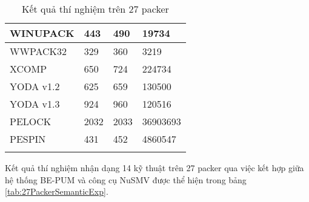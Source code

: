 \begin{small}
\begin{longtable}{|l|l|l|l|}
\hline 
WINUPACK							& 443				& 490				& 19734			\\
\hline 
WWPACK32							& 329				& 360				& 3219			\\
\hline 
XCOMP								& 650				& 724				& 224734		\\
\hline 
YODA v1.2							& 625				& 659				& 130500		\\
\hline 
YODA v1.3							& 924				& 960				& 120516		\\
\hline 
PELOCK								& 2032				& 2033				& 36903693		\\
\hline 
PESPIN								& 431				& 452				& 4860547		\\
\hline
\caption {Kết quả thí nghiệm trên 27 packer}\label{tab:27PackerExp}
\end{longtable}
\end{small}

\hspace{0.5cm}Kết quả thí nghiệm nhận dạng 14 kỹ thuật trên 27 packer qua việc kết hợp giữa hệ thống BE-PUM và công cụ NuSMV được thể hiện trong bảng \ref {tab:27PackerSemanticExp}.

